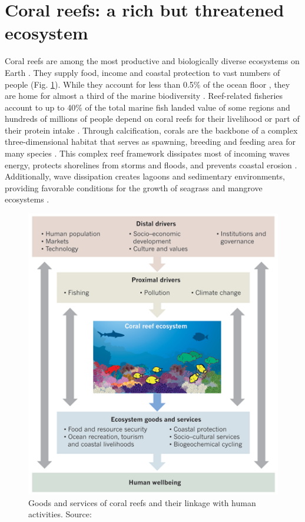 \section{Coral reefs: a rich but threatened ecosystem}

Coral reefs are among the most productive and biologically diverse ecosystems on Earth \citep{connell1978diversity, moberg1999ecological}. They supply food, income and coastal protection to vast numbers of people (Fig. \ref{intro:corals}). While they account for less than 0.5\% of the ocean floor \citep{spalding1997new}, they are home for almost a third of the marine biodiversity \citep{moberg1999ecological}. Reef-related fisheries account to up to 40\% of the total marine
fish landed value of some regions \citep{teh2013global} and hundreds of millions of people depend on coral reefs for their livelihood or part of their protein intake \citep{salvat1992coral,hoegh2019people}. Through calcification, corals are the backbone of a complex three-dimensional habitat that serves as spawning, breeding and feeding area for many species \citep{moberg1999ecological,rogers2014vulnerability}. This complex reef framework  dissipates most of incoming waves energy, protects shorelines from storms and floods, and prevents coastal erosion \citep{ferrario2014effectiveness,elliff2017coral}. Additionally, wave dissipation creates lagoons and sedimentary environments, providing favorable conditions for the growth of seagrass and mangrove ecosystems \citep{moberg1999ecological,guannel2016power}.

\begin{figure}
    \centering
    \includegraphics[width=.8\textwidth]{chapters/intro/figures/anthropocene.png}
    \caption{Goods and services of coral reefs and their linkage with human activities. Source: \cite{hughes2017coral}}
    \label{intro:corals}
\end{figure}

